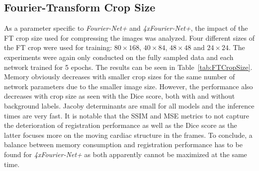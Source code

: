 \documentclass[english,version-2022-01]{uzl-thesis} %
\begin{document}
\subsection{Fourier-Transform Crop Size} \label{SubSec:ResultsFTCropSize}
As a parameter specific to \emph{Fourier-Net+} and \emph{4xFourier-Net+}, the impact of the FT crop size used for compressing the images was analyzed. Four different sizes of the FT crop were used for training: $80 \times 168$, $40 \times 84$, $48 \times 48$ and $24 \times 24$. The experiments were again only conducted on the fully sampled data and each network trained for 5 epochs. The results can be seen in Table~\ref{tab:FTCropSize}. Memory obviously decreases with smaller crop sizes for the same number of network parameters due to the smaller image size. However, the performance also decreases with crop size as seen with the Dice score, both with and without background labels. Jacoby determinants are small for all models and the inference times are very fast. It is notable that the SSIM and MSE metrics to not capture the deterioration of registration performance as well as the Dice score as the latter focuses more on the moving cardiac structure in the frames. To conclude, a balance between memory consumption and registration performance has to be found for \emph{4xFourier-Net+} as both apparently cannot be maximized at the same time.

\end{document}
